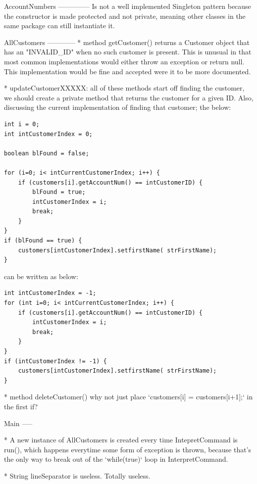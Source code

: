 AccountNumbers
--------------
Is not a well implemented Singleton pattern because the constructor is made protected and not private, meaning other classes in the same package can still instantiate it.


AllCustomers
------------
* method getCustomer() returns a Customer object that has an "INVALID\_ID" when no such customer is present. This is unusual in that most common implementations would either throw an exception or return null. This implementation would be fine and accepted were it to be more documented. 


* updateCustomerXXXXX: all of these methods start off finding the customer, we should create a private method that returns the customer for a given ID. Also, discussing the current implementation of finding that customer; the below: 

\begin{lstlisting}	
int i = 0;
int intCustomerIndex = 0;

boolean blFound = false;

for (i=0; i< intCurrentCustomerIndex; i++) {
	if (customers[i].getAccountNum() == intCustomerID) {
		blFound = true;
		intCustomerIndex = i;
		break;
	}
}
if (blFound == true) {
	customers[intCustomerIndex].setfirstName( strFirstName);
}
\end{lstlisting}
can be written as below: 
\begin{lstlisting}
int intCustomerIndex = -1;
for (int i=0; i< intCurrentCustomerIndex; i++) {
	if (customers[i].getAccountNum() == intCustomerID) {
		intCustomerIndex = i;
		break;
	}
}
if (intCustomerIndex != -1) {
	customers[intCustomerIndex].setfirstName( strFirstName);
}
\end{lstlisting}

* method deleteCustomer() 
why not just place `customers[i] = customers[i+1];` in the first if? 

Main
-----

* A new instance of AllCustomers is created every time IntepretCommand is run(), which happens everytime some form of exception is thrown, because that's the only way to break out of the `while(true)` loop in InterpretCommand. 

* String lineSeparator is useless. Totally useless.
